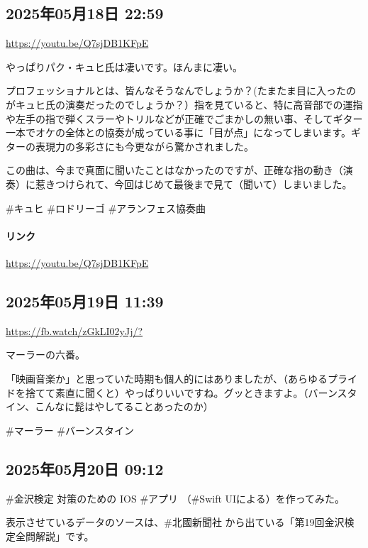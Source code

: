 \subsection*{2025年05月18日 22:59}

\url{https://youtu.be/Q7sjDB1KFpE}

やっぱりパク・キュヒ氏は凄いです。ほんまに凄い。

プロフェッショナルとは、皆んなそうなんでしょうか？(たまたま目に入ったのがキュヒ氏の演奏だったのでしょうか？）指を見ていると、特に高音部での運指や左手の指で弾くスラーやトリルなどが正確でごまかしの無い事、そしてギター一本でオケの全体との協奏が成っている事に「目が点」になってしまいます。ギターの表現力の多彩さにも今更ながら驚かされました。

この曲は、今まで真面に聞いたことはなかったのですが、正確な指の動き（演奏）に惹きつけられて、今回はじめて最後まで見て（聞いて）しまいました。

\#キュヒ \#ロドリーゴ \#アランフェス協奏曲

\paragraph{リンク}
\url{https://youtu.be/Q7sjDB1KFpE}

\subsection*{2025年05月19日 11:39}

\url{https://fb.watch/zGkLI02yJj/?}

マーラーの六番。

「映画音楽か」と思っていた時期も個人的にはありましたが、（あらゆるプライドを捨てて素直に聞くと）やっぱりいいですね。グッときますよ。（バーンスタイン、こんなに髭はやしてることあったのか）

\#マーラー \#バーンスタイン

\subsection*{2025年05月20日 09:12}

\#金沢検定 対策のための IOS \#アプリ （\#Swift UIによる）を作ってみた。

表示させているデータのソースは、\#北國新聞社 から出ている「第19回金沢検定全問解説」です。

